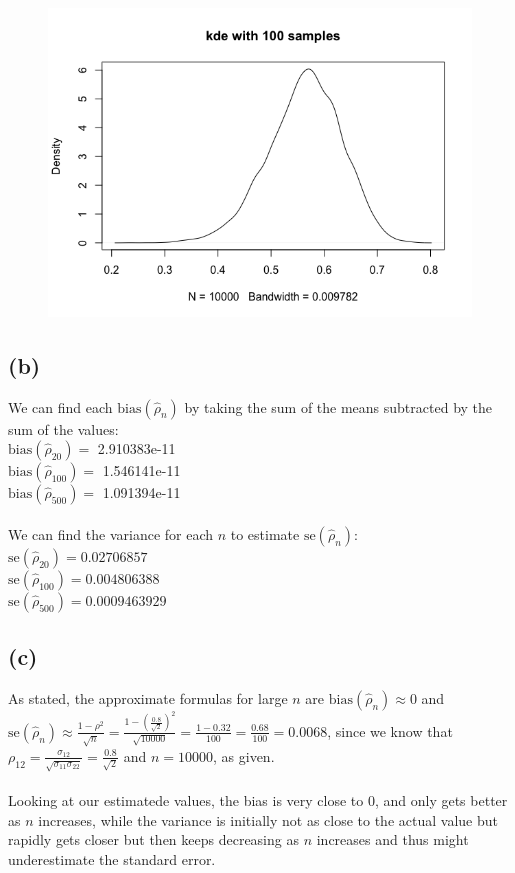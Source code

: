 \documentclass{article}
\begin{document}
{\begin{figure}[t!]
\end{figure}
\begin{figure}[t!]
  \centering
  \includegraphics[width=450pt]{hw5_2a_100.png}
\end{figure}
\newpage

\subsection*{(b)}

We can find each $\text{bias}(\hat{\rho}_n)$ by taking the sum of the means subtracted by the sum of the values: \\
$\text{bias}(\hat{\rho}_{20}) = 
$ 2.910383e-11 \\
$\text{bias}(\hat{\rho}_{100}) = $ 1.546141e-11 \\
$\text{bias}(\hat{\rho}_{500}) = $ 1.091394e-11 \\ \\
We can find the variance for each $n$ to estimate $\text{se}(\hat{\rho}_n)$: \\
$\text{se}(\hat{\rho}_{20}) = 0.02706857$ \\
$\text{se}(\hat{\rho}_{100}) = 0.004806388$ \\
$\text{se}(\hat{\rho}_{500}) = 0.0009463929$

\subsection*{(c)}

As stated, the approximate formulas for large $n$ are $\text{bias}(\hat{\rho}_n) \approx 0$ and $\text{se}(\hat{\rho}_n) \approx \frac{1-\rho^2}{\sqrt{n}} = \frac{1 - (\frac{0.8}{\sqrt{2}})^2}{\sqrt{10000}} = \frac{1 - 0.32}{100} = \frac{0.68}{100} = 0.0068$, since we know that $\rho_{12} = \frac{\sigma_{12}}{\sqrt{\sigma_{11}\sigma_{22}}} = \frac{0.8}{\sqrt{2}}$ and $n = 10000$, as given. \\ \\
Looking at our estimatede values, the bias is very close to 0, and only gets better as $n$ increases, while the variance is initially not as close to the actual value but rapidly gets closer but then keeps decreasing as $n$ increases and thus might underestimate the standard error.

}
\end{document}
